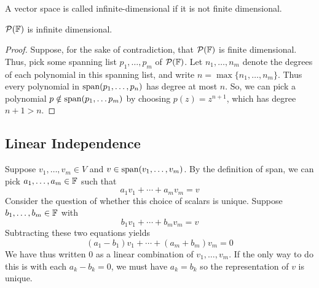\begin{definition}
    A vector space is called infinite-dimensional if it is not finite dimensional.
\end{definition}
\begin{theorem}
    $\mathcal{P}(\mathbb F)$ is infinite dimensional.
\end{theorem}
\begin{proof}
    Suppose, for the sake of contradiction, that $\mathcal{P}(\mathbb F)$ is finite dimensional. Thus, pick some spanning list $p_1, \dots, p_m$ of $\mathcal{P}(\mathbb F)$. Let $n_1, \dots, n_m$ denote the degrees of each polynomial in this spanning list, and write $n = \max\{n_1, \dots, n_m\}$. Thus every polynomial in $\operatorname{span}(p_1, \dots, p_n)$ has degree at most $n$. So, we can pick a polynomial $p\notin \operatorname{span}(p_1, \dots p_m)$ by choosing $p(z) = z^{n+1}$, which has degree $n+1 > n$.
\end{proof}
\subsection*{Linear Independence}
Suppose $v_1, \dots, v_m \in V$ and $v \in \operatorname{span}(v_1, \dots, v_m)$. By the definition of span, we can pick $a_1, \dots, a_m \in \mathbb F$ such that
\[ a_1v_1 + \cdots + a_mv_m = v\]
Consider the question of whether this choice of scalars is unique. Suppose $b_1, \dots, b_m \in \mathbb F$ with
\[ b_1v_1 + \cdots + b_mv_m = v\]
Subtracting these two equations yields
\[ (a_1- b_1)v_1 + \cdots + (a_m+b_m)v_m = 0\]
We have thus written $0$ as a linear combination of $v_1, \dots, v_m$. If the only way to do this is with each $a_k-b_k = 0$, we must have $a_k=b_k$ so the representation of $v$ is unique.

